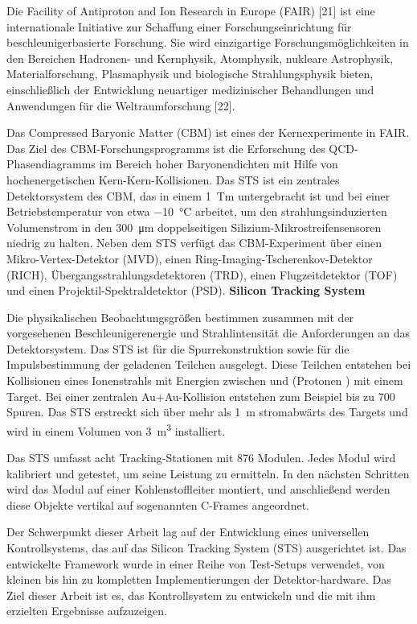 Die Facility of Antiproton and Ion Research in Europe (FAIR) [21] ist eine internationale Initiative zur Schaffung einer Forschungseinrichtung für beschleunigerbasierte Forschung. Sie wird einzigartige Forschungsmöglichkeiten in den Bereichen Hadronen- und Kernphysik, Atomphysik, nukleare Astrophysik, Materialforschung, Plasmaphysik und biologische Strahlungsphysik bieten, einschließlich der Entwicklung neuartiger medizinischer Behandlungen und Anwendungen für die Weltraumforschung [22].

Das Compressed Baryonic Matter (CBM) ist eines der Kernexperimente in FAIR. Das Ziel des CBM-Forschungsprogramms ist die Erforschung des QCD-Phasendiagramms im Bereich hoher Baryonendichten mit Hilfe von hochenergetischen Kern-Kern-Kollisionen. Das \gls{STS} ist ein zentrales Detektorsystem des CBM, das in einem 1~Tm untergebracht ist und bei einer Betriebstemperatur von etwa \SI{-10}{\celsius} arbeitet, um den strahlungsinduzierten Volumenstrom in den \SI{300}{\micro\metre} doppelseitigen Silizium-Mikrostreifensensoren niedrig zu halten. Neben dem \gls{STS} verfügt das CBM-Experiment über einen Mikro-Vertex-Detektor (MVD), einen Ring-Imaging-Tscherenkov-Detektor (RICH), Übergangsstrahlungsdetektoren (TRD), einen Flugzeitdetektor (TOF) und einen Projektil-Spektraldetektor (PSD).
\bigbreak
\textbf{Silicon Tracking System}
\bigbreak

Die physikalischen Beobachtungsgrößen bestimmen zusammen mit der vorgesehenen Beschleunigerenergie und Strahlintensität die Anforderungen an das Detektorsystem. Das \gls{STS} ist für die Spurrekonstruktion sowie für die Impulsbestimmung der geladenen Teilchen ausgelegt. Diese Teilchen entstehen bei Kollisionen eines Ionenstrahls mit Energien zwischen  und  (Protonen ) mit einem Target. Bei einer zentralen Au+Au-Kollision entstehen zum Beispiel bis zu 700 Spuren. Das \gls{STS} erstreckt sich über mehr als \SI{1}{\meter} stromabwärts des Targets und wird in einem Volumen von \SI{3}{\cubic\meter} installiert. 

Das \gls{STS} umfasst acht Tracking-Stationen mit 876 Modulen. Jedes Modul wird kalibriert und getestet, um seine Leistung zu ermitteln. In den nächsten Schritten wird das Modul auf einer Kohlenstoffleiter montiert, und anschließend werden diese Objekte vertikal auf sogenannten C-Frames angeordnet. 

Der Schwerpunkt dieser Arbeit lag auf der Entwicklung eines universellen Kontrollsystems, das auf das Silicon Tracking System (\gls{STS}) ausgerichtet ist. Das entwickelte Framework wurde in einer Reihe von Test-Setups verwendet, von kleinen bis hin zu kompletten Implementierungen der Detektor-hardware. Das Ziel dieser Arbeit ist es, das Kontrollsystem zu entwickeln und die mit ihm erzielten Ergebnisse aufzuzeigen. 

